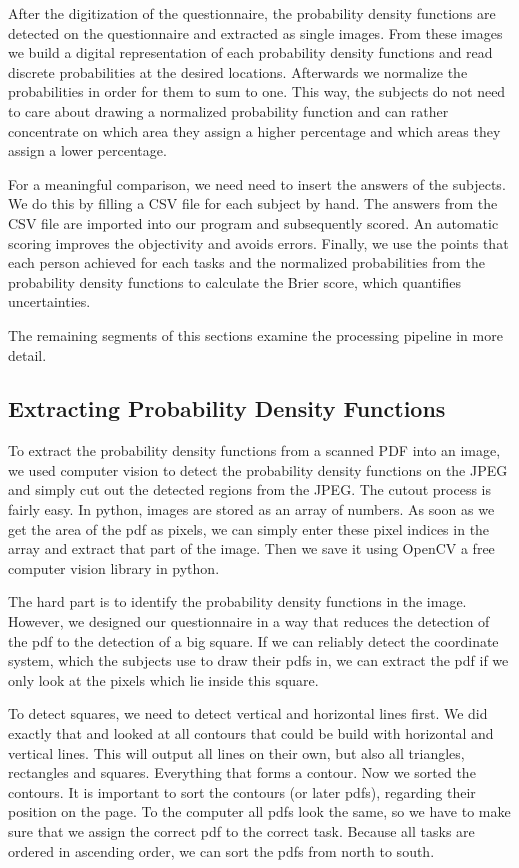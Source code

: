 \documentclass[../main/main.tex]{subfiles}
\begin{document}
	After the digitization of the questionnaire, the probability density functions are detected on the questionnaire and extracted as single images. From these images we build a digital representation of each probability density functions and read discrete probabilities at the desired locations. Afterwards we normalize the probabilities in order for them to sum to one. This way, the subjects do not need to care about drawing a normalized probability function and can rather concentrate on which area they assign a higher percentage and which areas they assign a lower percentage. 
	
	For a meaningful comparison, we need need to insert the answers of the subjects. We do this by filling a CSV file for each subject by hand. The answers from the CSV file are imported into our program and subsequently scored. An automatic scoring improves the objectivity and avoids errors. Finally, we use the points that each person achieved for each tasks and the normalized probabilities from the probability density functions to calculate the Brier score, which quantifies uncertainties.
	
	The remaining segments of this sections examine the processing pipeline in more detail.
	
	
	\subsection{Extracting Probability Density Functions}
	
	To extract the probability density functions from a scanned PDF into an image, we used computer vision to detect the probability density functions on the JPEG and simply cut out the detected regions from the JPEG. The cutout process is fairly easy. In python, images are stored as an array of numbers. As soon as we get the area of the pdf as pixels, we can simply enter these pixel indices in the array and extract that part of the image. Then we save it using OpenCV a free computer vision library in python.
	
	The hard part is to identify the probability density functions in the image. However, we designed our questionnaire in a way that reduces the detection of the pdf to the detection of a big square. If we can reliably detect the coordinate system, which the subjects use to draw their pdfs in, we can extract the pdf if we only look at the pixels which lie inside this square.
	
	To detect squares, we need to detect vertical and horizontal lines first. We did exactly that and looked at all contours that could be build with horizontal and vertical lines. This will output all lines on their own, but also all triangles, rectangles and squares. Everything that forms a contour. Now we sorted the contours. It is important to sort the contours (or later pdfs), regarding their position on the page. To the computer all pdfs look the same, so we have to make sure that we assign the correct pdf to the correct task. Because all tasks are ordered in ascending order, we can sort the pdfs from north to south.
	
\end{document}
